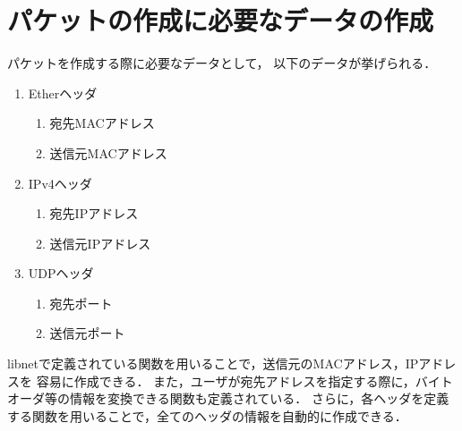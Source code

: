 \documentclass[12pt]{jsarticle}
\begin{document}
\section{パケットの作成に必要なデータの作成}
パケットを作成する際に必要なデータとして，
以下のデータが挙げられる．
\begin{enumerate}
    \item Etherヘッダ
        \begin{enumerate}
            \item 宛先MACアドレス
            \item 送信元MACアドレス
        \end{enumerate}
    \item IPv4ヘッダ
        \begin{enumerate}
            \item 宛先IPアドレス
            \item 送信元IPアドレス
        \end{enumerate}
    \item UDPヘッダ
        \begin{enumerate}
            \item 宛先ポート
            \item 送信元ポート
        \end{enumerate}
\end{enumerate}
libnetで定義されている関数を用いることで，送信元のMACアドレス，IPアドレスを
容易に作成できる．
また，ユーザが宛先アドレスを指定する際に，バイトオーダ等の情報を変換できる関数も定義されている．
さらに，各ヘッダを定義する関数を用いることで，全てのヘッダの情報を自動的に作成できる．
\end{document}
